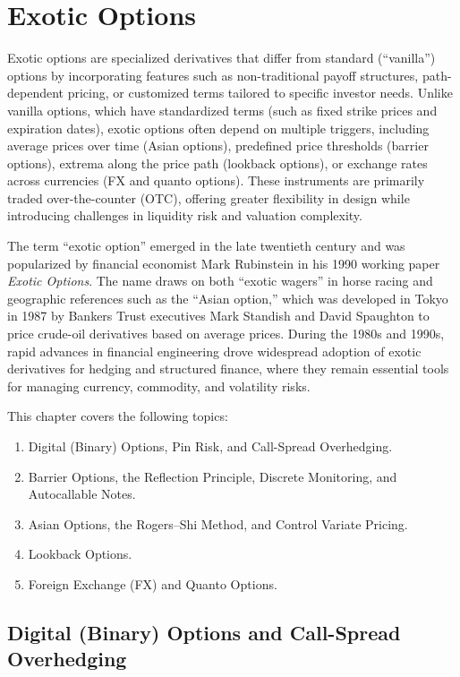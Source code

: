 \chapter{Exotic Options}\label{ch:exotic-options}

Exotic options are specialized derivatives that differ from standard (``vanilla'') options by incorporating features such as non-traditional payoff structures, path-dependent pricing, or customized terms tailored to specific investor needs. Unlike vanilla options, which have standardized terms (such as fixed strike prices and expiration dates), exotic options often depend on multiple triggers, including average prices over time (Asian options), predefined price thresholds (barrier options), extrema along the price path (lookback options), or exchange rates across currencies (FX and quanto options). These instruments are primarily traded over-the-counter (OTC), offering greater flexibility in design while introducing challenges in liquidity risk and valuation complexity.

The term ``exotic option'' emerged in the late twentieth century and was popularized by financial economist Mark Rubinstein in his 1990 working paper \textit{Exotic Options}. The name draws on both ``exotic wagers'' in horse racing and geographic references such as the ``Asian option,'' which was developed in Tokyo in 1987 by Bankers Trust executives Mark Standish and David Spaughton to price crude-oil derivatives based on average prices. During the 1980s and 1990s, rapid advances in financial engineering drove widespread adoption of exotic derivatives for hedging and structured finance, where they remain essential tools for managing currency, commodity, and volatility risks.

This chapter covers the following topics:
\begin{enumerate}
    \item Digital (Binary) Options, Pin Risk, and Call-Spread Overhedging.
    \item Barrier Options, the Reflection Principle, Discrete Monitoring, and Autocallable Notes.
    \item Asian Options, the Rogers--Shi Method, and Control Variate Pricing.
    \item Lookback Options.
    \item Foreign Exchange (FX) and Quanto Options.
\end{enumerate}

\section{Digital (Binary) Options and Call-Spread Overhedging}


